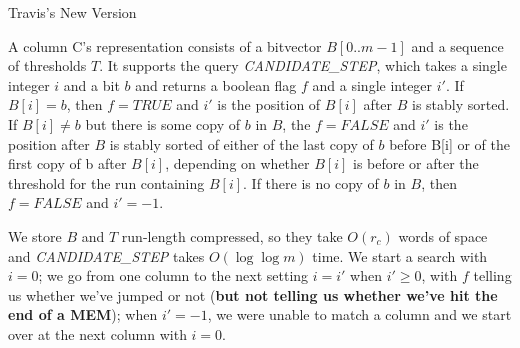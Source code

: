 \documentclass{beamer}
\begin{document}
                                                                    \begin{frame}{Travis's New Version}
                                                                    \begin{block}{}
                                                                    A column C's representation consists of a bitvector $B[0..m - 1]$ and a
                                                                    sequence of thresholds $T$.  It supports the query \textit{CANDIDATE\_STEP},
                                                                    which takes a single 
                                                                    integer $i$ and a bit $b$ and returns a boolean flag $f$ and a single
                                                                    integer $i'$. 
                                                                    If $B[i] = b$, then $f = TRUE$ and $i'$ is the position of $B[i]$ after $B$
                                                                    is stably 
                                                                    sorted. If $B[i] \neq b$ but there is some copy of $b$ in $B$, the $f =
                                                                    FALSE$ and $i'$ 
                                                                    is the position after $B$ is stably sorted of either of the last copy of $b$
                                                                    before B[i] or of the first copy of b after $B[i]$, depending on whether
                                                                    $B[i]$ is 
                                                                    before or after the threshold for the run containing $B[i]$.  If there is no
                                                                    copy of $b$ in $B$, then $f = FALSE$ and $i' = -1$. 

                                                                    We store $B$ and $T$ run-length compressed, so they take $O(r_c)$ words of
                                                                    space and \textit{CANDIDATE\_STEP} takes $O(\log \log m)$ time.  We start a
                                                                    search with $i = 0$; we go 
                                                                    from one column to the next setting $i = i'$ when $i' \geq 0$, with $f$
                                                                    telling us whether we've jumped or not (\textbf{but not telling us whether
                                                                    we've hit the end of a MEM}); when $i' = -1$, we were unable to match a
                                                                    column and we start over at the next column with $i = 0$.  
                                                                    \end{block}
                                                                    \end{frame}
\end{document}
